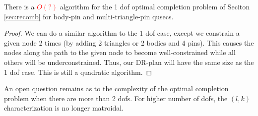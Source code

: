
\begin{theorem}
    There is a \textcolor{red}{$O(?)$} algorithm for the 1 dof optimal completion problem of Seciton \ref{sec:recomb} for body-pin and multi-triangle-pin qusecs.
\end{theorem}

\begin{proof}
    We can do a similar algorithm to the 1 dof case, except we constrain a given node 2 times (by adding 2 triangles or 2 bodies and 4 pins). This causes the nodes along the path to the given node to become well-constrained while all others will be underconstrained. Thus, our DR-plan will have the same size as the 1 dof case. This is still a quadratic algorithm.


\end{proof}

An open question remains as to the complexity of the optimal completion problem when there are more than 2 dofs. For higher number of dofs, the $(l,k)$ characterization is no longer matroidal.

